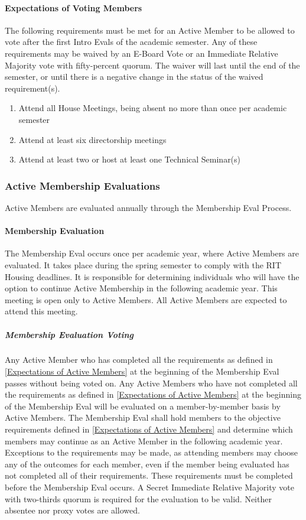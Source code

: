 \documentclass{article}
\newcommand{\asubsection}[1]{\subsubsection{#1} \label{#1}}
\newcommand{\asubsubsection}[1]{\paragraph{#1} \label{#1}}
\newcommand{\asubsubsubsection}[1]{\subparagraph{#1} \label{#1}}
\begin{document}
\asubsubsection{Expectations of Voting Members}
\renewcommand{\theenumi}{\arabic{enumi}} %

The following requirements must be met for an Active Member to be allowed to vote after the first Intro Evals of the academic semester.
Any of these requirements may be waived by an E-Board Vote or an Immediate Relative Majority vote with fifty-percent quorum.
The waiver will last until the end of the semester, or until there is a negative change in the status of the waived requirement(s).
\begin{enumerate}
	\item Attend all House Meetings, being absent no more than once per academic semester
	\item Attend at least six directorship meetings
	\item Attend at least two or host at least one Technical Seminar(s)
\end{enumerate}

\asubsection{Active Membership Evaluations}
Active Members are evaluated annually through the Membership Eval Process.

\asubsubsection{Membership Evaluation}
The Membership Eval occurs once per academic year, where Active Members are evaluated.
It takes place during the spring semester to comply with the RIT Housing deadlines.
It is responsible for determining individuals who will have the option to continue Active Membership in the following academic year.
This meeting is open only to Active Members.
All Active Members are expected to attend this meeting.

\asubsubsubsection{Membership Evaluation Voting}
Any Active Member who has completed all the requirements as defined in \ref{Expectations of Active Members} at the beginning of the Membership Eval passes without being voted on.
Any Active Members who have not completed all the requirements as defined in \ref{Expectations of Active Members} at the beginning of the Membership Eval will be evaluated on a member-by-member basis by Active Members.
The Membership Eval shall hold members to the objective requirements defined in \ref{Expectations of Active Members} and determine which members may continue as an Active Member in the following academic year.
Exceptions to the requirements may be made, as attending members may choose any of the outcomes for each member, even if the member being evaluated has not completed all of their requirements.
These requirements must be completed before the Membership Eval occurs.
A Secret Immediate Relative Majority vote with two-thirds quorum is required for the evaluation to be valid.
Neither absentee nor proxy votes are allowed.
\end{document}
